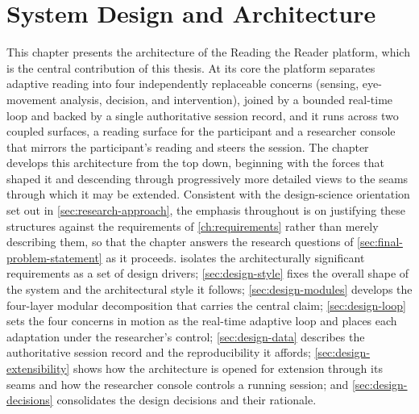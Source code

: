 \chapter{System Design and Architecture}
\label{ch:design}

%

This chapter presents the architecture of the Reading the Reader platform, which is the central contribution of this thesis.
At its core the platform separates adaptive reading into four independently replaceable concerns (sensing, eye-movement analysis, decision, and intervention), joined by a bounded real-time loop and backed by a single authoritative session record, and it runs across two coupled surfaces, a reading surface for the participant and a researcher console that mirrors the participant's reading and steers the session.
The chapter develops this architecture from the top down, beginning with the forces that shaped it and descending through progressively more detailed views to the seams through which it may be extended.
Consistent with the design-science orientation set out in \cref{sec:research-approach}, the emphasis throughout is on justifying these structures against the requirements of \cref{ch:requirements} rather than merely describing them, so that the chapter answers the research questions of \cref{sec:final-problem-statement} as it proceeds.
 isolates the architecturally significant requirements as a set of design drivers; \cref{sec:design-style} fixes the overall shape of the system and the architectural style it follows; \cref{sec:design-modules} develops the four-layer modular decomposition that carries the central claim; \cref{sec:design-loop} sets the four concerns in motion as the real-time adaptive loop and places each adaptation under the researcher's control; \cref{sec:design-data} describes the authoritative session record and the reproducibility it affords; \cref{sec:design-extensibility} shows how the architecture is opened for extension through its seams and how the researcher console controls a running session; and \cref{sec:design-decisions} consolidates the design decisions and their rationale.

